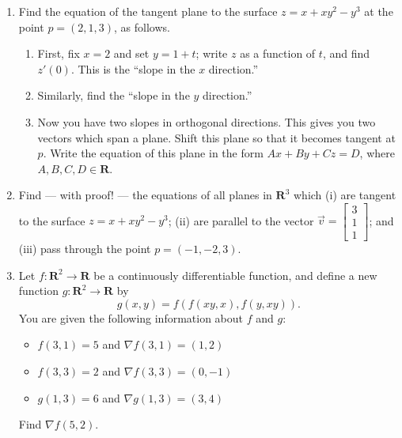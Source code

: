 \documentclass{article}
\newcommand{\R}{\mathbf{R}}
\theoremstyle{plain} %
\numberwithin{thm}{section} %
\theoremstyle{definition}
\begin{document}
        \begin{enumerate}[label=(\alph*)]
            \item Find the equation of the tangent plane to the surface $z=x+xy^2-y^3$ at the point $p=(2,1,3)$, as follows.
            \begin{enumerate}[label=(\roman*)]
                \item First, fix $x=2$ and set $y=1+t$; write $z$ as a function of $t$, and find $z'(0)$. This is the ``slope in the $x$ direction.''
                \item Similarly, find the ``slope in the $y$ direction.''
                \item Now you have two slopes in orthogonal directions. This gives you two vectors which span a plane. Shift this plane so that it becomes tangent at $p$. Write the equation of this plane in the form $Ax+By+Cz=D$, where $A,B,C,D\in \R$.
            \end{enumerate}
            
            \item Find --- with proof! --- the equations of all planes in $\R^3$ which (i) are tangent to the surface $z=x+xy^2-y^3$; (ii) are parallel to the vector $\vec{v}=\begin{bmatrix} 3 \\ 1 \\ 1\end{bmatrix}$; and (iii) pass through the point $p=(-1,-2,3)$.
            
            \item Let $f:\R^2\rightarrow \R$ be a continuously differentiable function, and define a new function $g:\R^2\rightarrow \R$ by
                \[ g(x,y) = f(f(xy,x),f(y,xy)). \]
            You are given the following information about $f$ and $g$:
                \begin{itemize}
                    \item $f(3,1)=5$ and $\nabla f(3,1)=(1,2)$
                    \item $f(3,3)=2$ and $\nabla f(3,3)=(0,-1)$
                    \item $g(1,3)=6$ and $\nabla g(1,3)=(3,4)$
                \end{itemize}
            Find $\nabla f(5,2)$.
        \end{enumerate}
\end{document}
